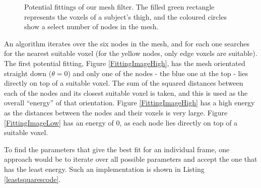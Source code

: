 \begin{figure}[tb]
	\centering
	\qquad
	\caption{Potential fittings of our mesh filter.
		The filled green rectangle represents the voxels of a subject's thigh,
		and the coloured circles show a select number of nodes in the mesh.}
	\label{FittingImages}
\end{figure}

An algorithm iterates over the six nodes in the mesh, and for each one searches for the nearest suitable voxel (for the yellow nodes, only edge voxels are suitable).
The first potential fitting, Figure \ref{FittingImageHigh}, has the mesh orientated straight down ($\theta = 0$) and only one of the nodes - the blue one at the top - lies directly on top of a suitable voxel.
The sum of the squared distances between each of the nodes and its closest suitable voxel is taken, and this is used as the overall ``energy'' of that orientation.
Figure \ref{FittingImageHigh} has a high energy as the distances between the nodes and their voxels is very large.
Figure \ref{FittingImageLow} has an energy of $0$, as each node lies directly on top of a suitable voxel.

To find the parameters that give the best fit for an individual frame, one approach would be to iterate over all possible parameters and accept the one that has the least energy.
Such an implementation is shown in Listing \ref{leastsquarescode}.

